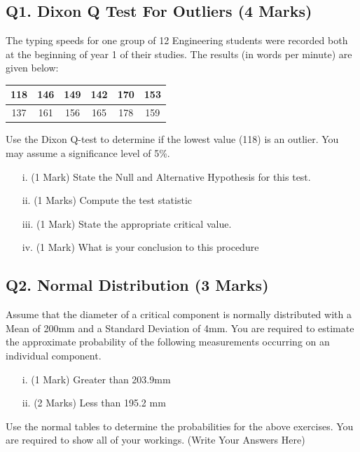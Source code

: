 \documentclass[a4paper,12pt]{article}
\begin{document}
\subsection*{Q1. Dixon Q Test For Outliers (4 Marks)}

The typing speeds for one group of 12 Engineering students were recorded both at the beginning of year 1 of their studies. The results (in words per minute) are given below:

\begin{center}
	\begin{tabular}{|c|c|c|c|c|c|}
		\hline
		118 & 146 & 149 & 142 & 170& 153\\ \hline
		137 & 161 & 156& 165&  178& 159
		\\ \hline
	\end{tabular}
\end{center}
Use the Dixon Q-test to determine if the lowest value (118) is an outlier. You may assume a significance level of 5\%.
\begin{itemize}
	\item[i.](1 Mark)	State the Null and Alternative Hypothesis for this test.
	\item[ii.](1 Marks) Compute the test statistic
	\item[iii.](1 Mark) State the appropriate critical value.
	\item[iv.](1 Mark) What is your conclusion to this procedure
\end{itemize}



\subsection*{Q2. Normal Distribution (3 Marks)} %
Assume that the diameter of a critical component is normally distributed with a Mean of 200mm and a Standard Deviation of 4mm. You are required  to estimate the approximate probability of the following measurements occurring on an individual component.
\begin{itemize}
	\item[i.](1 Mark)	Greater than 203.9mm
	\item[ii.](2 Marks) Less than 195.2 mm
\end{itemize}
\bigskip
\noindent Use the normal tables to determine the probabilities for the above exercises. You are required to show all of your workings.
\newpage
(Write Your Answers Here)
\newpage
\vspace{0.25cm}
\end{document}
